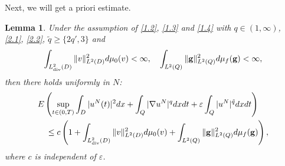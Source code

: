 \documentclass[reqno]{amsart}
\newtheorem{Lemma}[Theorem]{Lemma}
\theoremstyle{definition}
\theoremstyle{remark}
\numberwithin{equation}{section} \allowdisplaybreaks
\begin{document}
Next, we will get a priori estimate.
\begin{Lemma}\label{lemma4.1}
Under the assumption of \eqref{1.2}, \eqref{1.3} and \eqref{1.4} with $q\in (1,\infty)$, \eqref{2.1}, \eqref{2.2}, $\tilde{q}\geq\{2q',3\}$ and
\begin{align}\label{4.4}
\int_{L^2_{\rm{div}}(D)}\|v\|^2_{L^2(D)}d\mu_0(v)<\infty,\quad
\int_{L^2(Q)}\|\mathbf{g}\|^2_{L^2(Q)}d\mu_f(\mathbf{g})<\infty,
\end{align}
then there holds uniformly in $N$:
\begin{align*}
&E\left(\sup_{t\in(0,T)}\int_{D}|u^N(t)|^2dx+\int_Q|\nabla u^N|^qdxdt+\varepsilon\int_Q|u^N|^{\tilde{q}}dxdt\right)\\
&\quad\leq
c\left(1+\int_{L^2_{\rm{div}}(D)}\|v\|^2_{L^2(D)}d\mu_0(v)+\int_{L^2(Q)}\|\mathbf{g}\|^2_{L^2(Q)}d\mu_f(\mathbf{g})\right),
\end{align*}
where $c$ is independent of $\varepsilon$.
\end{Lemma}
\end{document}
